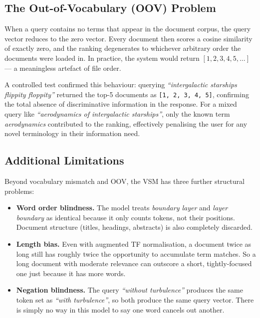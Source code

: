 \documentclass{article}
\begin{document}
\subsection{The Out-of-Vocabulary (OOV) Problem}

When a query contains no terms that appear in the document corpus, the query vector reduces to the zero vector. Every document then scores a cosine similarity of exactly zero, and the ranking degenerates to whichever arbitrary order the documents were loaded in. In practice, the system would return $[1, 2, 3, 4, 5, \ldots]$ --- a meaningless artefact of file order.

A controlled test confirmed this behaviour: querying \textit{``intergalactic starships flippity floppity''} returned the top-5 documents as \texttt{[1, 2, 3, 4, 5]}, confirming the total absence of discriminative information in the response. For a mixed query like \textit{``aerodynamics of intergalactic starships''}, only the known term \textit{aerodynamics} contributed to the ranking, effectively penalising the user for any novel terminology in their information need.

\subsection{Additional Limitations}

Beyond vocabulary mismatch and OOV, the VSM has three further structural problems:

\begin{itemize}[noitemsep]
    \item \textbf{Word order blindness.} The model treats \textit{boundary layer} and \textit{layer boundary} as identical because it only counts tokens, not their positions. Document structure (titles, headings, abstracts) is also completely discarded.
    \item \textbf{Length bias.} Even with augmented TF normalisation, a document twice as long still has roughly twice the opportunity to accumulate term matches. So a long document with moderate relevance can outscore a short, tightly-focused one just because it has more words.
    \item \textbf{Negation blindness.} The query \textit{``without turbulence''} produces the same token set as \textit{``with turbulence''}, so both produce the same query vector. There is simply no way in this model to say one word cancels out another.
\end{itemize}
\end{document}
